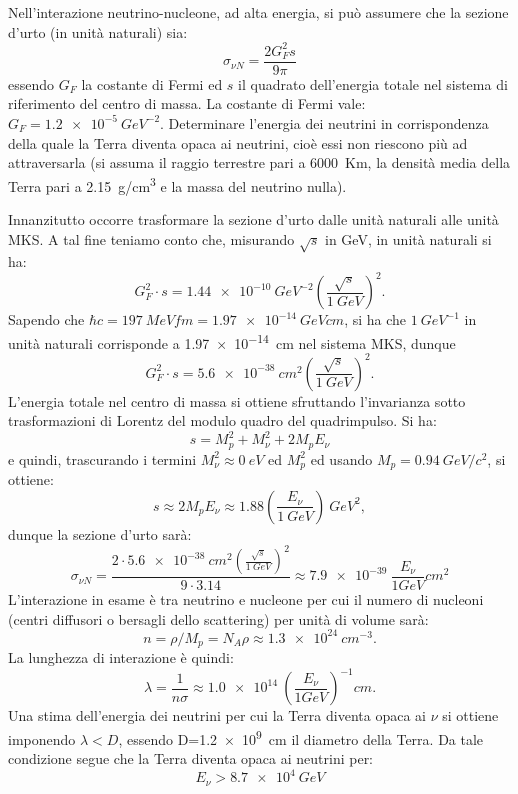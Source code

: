\begin{Exercise}[title={Sezione d'urto, unit\`a di misura}]
Nell'interazione neutrino-nucleone, ad alta energia, si pu\`o assumere 
che la sezione d'urto (in unit\`a naturali) sia:
\[
\sigma_{\nu N}=\frac{2G_F^2 s}{9\pi}
\]
essendo $G_F$ la costante di Fermi ed $s$ il quadrato dell'energia
totale nel sistema di riferimento del centro di massa. La costante di
Fermi vale: $G_F=\SI{1.2e-5}{GeV^{-2}}$. Determinare l'energia dei
neutrini in corrispondenza della quale la Terra diventa opaca ai
neutrini, cio\`e essi non riescono pi\`u ad attraversarla (si assuma
il raggio terrestre pari a \SI{6000}{Km}, la densit\`a media della
Terra pari a \SI{2.15}{g/cm^3} e la massa del neutrino nulla).
\end{Exercise}
\begin{Answer}
  Innanzitutto occorre trasformare la sezione d'urto dalle unit\`a
  naturali alle unit\`a MKS. A tal fine teniamo conto che, misurando
  $\sqrt{s}$ in GeV, in unit\`a naturali si ha:
  \[
  G_F^2 \cdot s = \SI{1.44e-10}{GeV^{-2}} \left(\frac{\sqrt{s}}{\SI{1}{GeV}}\right)^2.
  \]
  Sapendo che $\hbar c = \SI{197}{MeV fm} = \SI{1.97e-14}{GeV cm}$, si
  ha che $\SI{1}{GeV^{-1}}$ in unit\`a naturali corrisponde a
  \SI{1.97e-14}{cm} nel sistema MKS, dunque
  \[
  G_F^2 \cdot s=\SI{5.6e-38}{cm^2} \left(\frac{\sqrt{s}}{\SI{1}{GeV}}\right)^2.
  \]
  L'energia totale nel centro di massa si ottiene sfruttando l'invarianza sotto 
  trasformazioni di Lorentz del modulo quadro del quadrimpulso. Si ha:
  \[
  s=M_p^2+M_{\nu}^2+2M_pE_\nu
  \]
  e quindi, trascurando i termini $M_\nu^2\approx \SI{0}{eV}$ ed $M_p^2$ ed usando $M_p=\SI{0.94}{GeV/c^2}$, si ottiene:
  \[
  s \approx 2M_pE_\nu \approx 1.88 \left (\frac{E_\nu}{\SI{1}{GeV}}\right ) \SI{}{GeV^2},
  \]
  dunque la sezione d'urto sar\`a:
  \[
  \sigma_{\nu N} = \frac{2\cdot \SI{5.6e-38}{cm^2} \left(\frac{\sqrt{s}}{\SI{1}{GeV}}\right)^2}{9\cdot3.14} \approx
  \SI{7.9e-39}{\frac{E_\nu}{1 GeV}cm^2}
  \]
  L'interazione in esame \`e tra neutrino e nucleone per cui il 
  numero di nucleoni (centri diffusori o bersagli dello scattering) per unit\`a di volume sar\`a:
  \[
  n=\rho/M_p=N_A\rho \approx \SI{1.3e24}{cm^{-3}}.
  \]
  La lunghezza di interazione \`e quindi:
  \[
  \lambda=\frac{1}{n\sigma} \approx \SI{1.0e14}{\left (\frac{E_\nu}{1 GeV}\right )^{-1} cm}.
  \]
  Una stima dell'energia dei neutrini per cui la Terra diventa opaca
  ai $\nu$ si ottiene imponendo $\lambda<D$, essendo D=\SI{1.2e9}{cm}
  il diametro della Terra.  Da tale condizione segue che la Terra
  diventa opaca ai neutrini per:
  \[
  E_{\nu}>\SI{8.7e4}{GeV}
  \]
\end{Answer}


